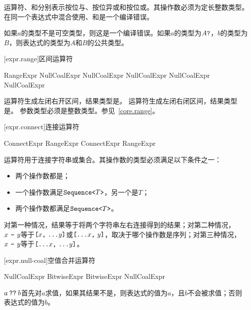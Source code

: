 \pnum
运算符、和分别表示按位与、按位异或和按位或。其操作数必须为定长整数类型。在同一个表达式中混合使用、和是一个编译错误。

\pnum
如果$a$的类型不是可空类型，则这是一个编译错误。如果$a$的类型为$A\texttt{?}$，$b$的类型为$B$，则表达式的类型为$A$和$B$的公共类型。

[expr.range]{区间运算符}

\begin{bnf}{RangeExpr}
    NullCoalExpr \br
    NullCoalExpr  NullCoalExpr \br
    NullCoalExpr  NullCoalExpr
\end{bnf}

\pnum
运算符生成左闭右开区间，结果类型是。
运算符生成左闭右闭区间，结果类型是。
参数类型必须是整数类型。参见~\ref{core.range}。

[expr.connect]{连接运算符}

\begin{bnf}{ConnectExpr}
    RangeExpr \br
    ConnectExpr \terminal{\~} RangeExpr
\end{bnf}

\pnum
运算符\tcode{\~}用于连接字符串或集合。其操作数的类型必须满足以下条件之一：

\begin{itemize}
    \item 两个操作数都是；
    \item 一个操作数满足$\texttt{Sequence<}T\texttt{>}$，另一个是$T$；
    \item 两个操作数都满足$\texttt{Sequence<}T\texttt{>}$。
\end{itemize}

对第一种情况，结果等于将两个字符串左右连接得到的结果；对第二种情况，$x\ \tcode{\~}\ y$等于$\tcode{[}x\tcode{,}\ \tcode{...}y\tcode{]}$或$\tcode{[...}x\tcode{,}\ y\tcode{]}$，取决于哪个操作数是序列；对第三种情况，$x\ \tcode{\~}\ y$等于$\tcode{[...}x\tcode{,}\ \tcode{...}y\tcode{]}$。

[expr.null-coal]{空值合并运算符}

\begin{bnf}{NullCoalExpr}
    BitwiseExpr \br
    BitwiseExpr  NullCoalExpr
\end{bnf}

\pnum
$a\mathbin{\texttt{??}}b$首先对$a$求值，如果其结果不是，则表达式的值为$a$，且$b$不会被求值；否则表达式的值为$b$。

